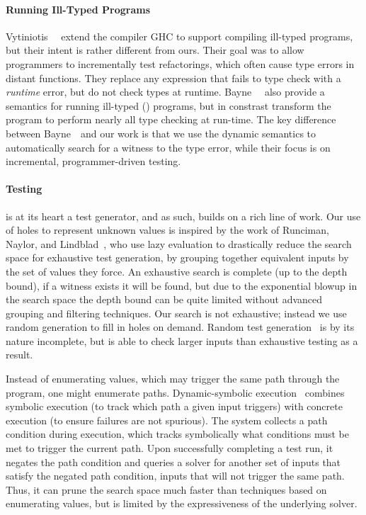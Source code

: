 \paragraph{Running Ill-Typed Programs}
\label{sec:running-ill-typed}
Vytiniotis~\etal~ extend the \haskell
compiler GHC to support compiling ill-typed programs, but their intent
is rather different from ours. Their goal was to allow programmers to
incrementally test refactorings, which often cause type errors in
distant functions. They replace any expression that fails to type
check with a \emph{runtime} error, but do not check types
at runtime.
%
Bayne~\etal~ also provide a semantics for running
ill-typed (\java) programs, but in constrast transform the program to
perform nearly all type checking at run-time. The key difference between
Bayne~\etal\ and our work is that we use the dynamic semantics to
automatically search for a witness to the type error, while their focus
is on incremental, programmer-driven testing.

\paragraph{Testing}\label{sec:testing}
%
\nanomaly is at its heart a test generator, and as such,
builds on a rich line of work.
%
Our use of holes to represent unknown values is inspired by the work of
Runciman, Naylor, and Lindblad~\cite{Runciman2008-ka,Naylor2007-mi,Lindblad2007-oy},
%
who use lazy evaluation to drastically reduce the search space for
exhaustive test generation, by grouping together equivalent inputs by
the set of values they force. An exhaustive search is complete (up to
the depth bound), if a witness exists it will be found, but due to the
exponential blowup in the search space the depth bound can be quite
limited without advanced grouping and filtering techniques.
%
Our search is not exhaustive; instead we use random generation to fill
in holes on demand.
%
Random test generation~\cite{Claessen2000-lj,Csallner2004-bf,Pacheco2007-at}
%
is by its nature incomplete, but is able to check larger inputs than
exhaustive testing as a result.

Instead of enumerating values, which may trigger the same path through
the program, one might enumerate paths.
%
Dynamic-symbolic execution~\cite{Godefroid2005-am,Cadar2008-kg,Tillmann2008-qc}
%
combines symbolic execution (to track which path a given input triggers)
with concrete execution (to ensure failures are not spurious). The
system collects a path condition during execution, which tracks
symbolically what conditions must be met to trigger the current
path. Upon successfully completing a test run, it negates the path
condition and queries a solver for another set of inputs that satisfy
the negated path condition, \ie inputs that will not trigger the same
path. Thus, it can prune the search space much faster than techniques
based on enumerating values, but is limited by the expressiveness of the
underlying solver.

